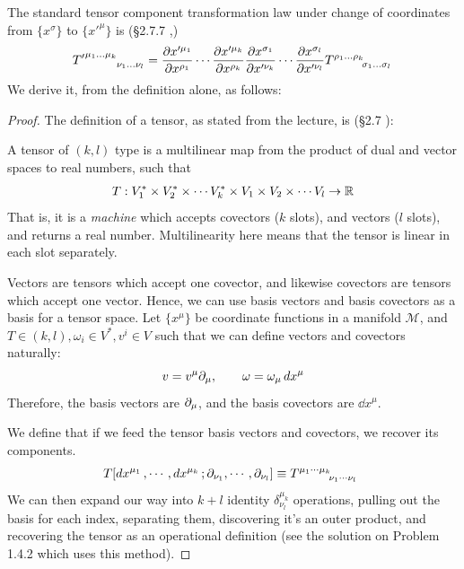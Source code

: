 \documentclass[12pt,a4paper]{article}
\newcommand{\mcal}[1]{\mathcal{#1}}
\begin{document}
	\begin{solution_pset}
		The standard tensor component transformation law under change of 
		coordinates from $\{x^\sigma\}$ to $\{x'^{\mu}\}$ is (\S 2.7.7 \cite{juan2026},\cite{Liang2023})
		\begin{equation}
			\label{eq:tensor-transformation-law}
			{T'}\indices{^{{\mu_1}\ldots{\mu_k}}_{{\nu_1}\ldots{\nu_l}}}
			=
			\pdv{x'^{\mu_1}}{x^{\rho_1}} 
			\cdots
			\pdv{x'^{\mu_k}}{x^{\rho_k}} 
			\pdv{x^{\sigma_1}}{x'^{\nu_k}} 
			\cdots
			\pdv{x^{\sigma_l}}{x'^{\nu_l}} 
			\tensor{T}{^{{\rho_1}\ldots{\rho_k}}_{{\sigma_1}\ldots{\sigma_l}}}
		\end{equation}
		We derive it, from the definition alone, as follows:

		\begin{proof}
		The definition of a tensor, as stated from the lecture, is (\S 2.7 \cite{juan2026}):

		A tensor of $(k,l)$ type is a multilinear map 
		from the product of dual and vector spaces to real numbers,
		such that
		\begin{equation}
			\label{eq:tensor-defn}
			T:
			V^*_1 \times 
			V^*_2 \times 
			\cdots
			V^*_k \times
			V_1 \times
			V_2 \times
			\cdots
			V_l
			\to \mathbb{R}
		\end{equation}
		That is, it is a \textit{machine} which accepts covectors ($k$ slots), and vectors ($l$ slots),
		and returns a real number. Multilinearity here means that the tensor is linear in each slot separately.

		Vectors are tensors which accept one covector, and likewise covectors are tensors which accept one vector.
		Hence, we can use basis vectors and basis covectors as a basis for a tensor space. Let $\{x^\mu\}$ 
		be coordinate functions in a manifold $\mcal M$, and 
		$T\in(k,l), \omega_i \in V^*, v^i\in V$
		such that we can define vectors and covectors naturally:
		\[
			v = v^\mu \partial_\mu, \qquad \omega = \omega_\mu \dd{x^\mu}
		\]
		Therefore, the basis vectors are $\partial_\mu$, and the basis covectors are $\dd{x^\mu}$.

		We define that if we feed the tensor basis vectors and covectors, we recover its components.
		\begin{align*}
			T[\dd{x^{\mu_1}},\cdots,\dd{x^{\mu_k}};\p_{\nu_1},\cdots,\p_{\nu_l}]
			\equiv
			T\indices{^{\mu_1\cdots \mu_k}_{\nu_1\cdots\nu_l}}\ 
		\end{align*}
		We can then expand our way into $k+l$ identity $\delta^{\mu_k}_{\nu_l}$ operations,
		pulling out the basis for each index, separating them, discovering it's an outer product,
		and recovering the tensor as an operational
		definition (see the solution on Problem 1.4.2 which uses this method).


\end{proof}
\end{solution_pset}
\end{document}
